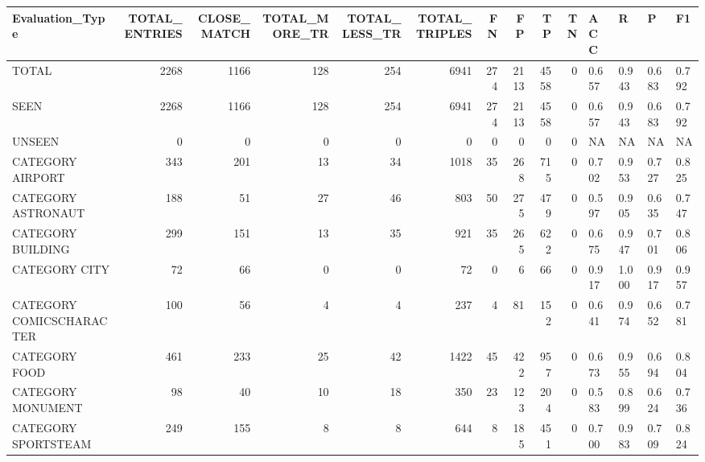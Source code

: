 \begin{tabular}{lrrrrrrrrrllll}
\hline
 Evaluation\_Type          &   TOTAL\_ENTRIES &   CLOSE\_MATCH &   TOTAL\_MORE\_TR &   TOTAL\_LESS\_TR &   TOTAL\_TRIPLES &   FN &   FP &   TP &   TN & ACC   & R     & P     & F1    \\
\hline
 TOTAL                    &            2268 &          1166 &             128 &             254 &            6941 &  274 & 2113 & 4558 &    0 & 0.657 & 0.943 & 0.683 & 0.792 \\
 SEEN                     &            2268 &          1166 &             128 &             254 &            6941 &  274 & 2113 & 4558 &    0 & 0.657 & 0.943 & 0.683 & 0.792 \\
 UNSEEN                   &               0 &             0 &               0 &               0 &               0 &    0 &    0 &    0 &    0 & NA    & NA    & NA    & NA    \\
 CATEGORY AIRPORT         &             343 &           201 &              13 &              34 &            1018 &   35 &  268 &  715 &    0 & 0.702 & 0.953 & 0.727 & 0.825 \\
 CATEGORY ASTRONAUT       &             188 &            51 &              27 &              46 &             803 &   50 &  275 &  479 &    0 & 0.597 & 0.905 & 0.635 & 0.747 \\
 CATEGORY BUILDING        &             299 &           151 &              13 &              35 &             921 &   35 &  265 &  622 &    0 & 0.675 & 0.947 & 0.701 & 0.806 \\
 CATEGORY CITY            &              72 &            66 &               0 &               0 &              72 &    0 &    6 &   66 &    0 & 0.917 & 1.000 & 0.917 & 0.957 \\
 CATEGORY COMICSCHARACTER &             100 &            56 &               4 &               4 &             237 &    4 &   81 &  152 &    0 & 0.641 & 0.974 & 0.652 & 0.781 \\
 CATEGORY FOOD            &             461 &           233 &              25 &              42 &            1422 &   45 &  422 &  957 &    0 & 0.673 & 0.955 & 0.694 & 0.804 \\
 CATEGORY MONUMENT        &              98 &            40 &              10 &              18 &             350 &   23 &  123 &  204 &    0 & 0.583 & 0.899 & 0.624 & 0.736 \\
 CATEGORY SPORTSTEAM      &             249 &           155 &               8 &               8 &             644 &    8 &  185 &  451 &    0 & 0.700 & 0.983 & 0.709 & 0.824 \\

\end{tabular}
